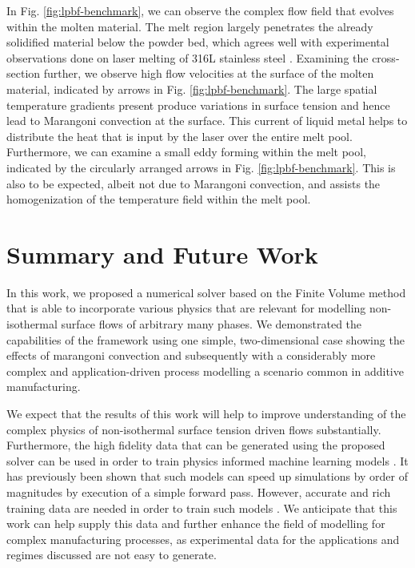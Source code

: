 \documentclass[conference,final]{IEEEtran}
\begin{document}
In Fig. \ref{fig:lpbf-benchmark}, we can observe the complex flow field that evolves within the molten material. The melt region largely penetrates the already solidified material below the powder bed, which agrees well with experimental observations done on laser melting of 316L stainless steel \cite{mohrInSituDefectDetection2020}.
Examining the cross-section further, we observe high flow velocities at the surface of the molten material, indicated by arrows in Fig. \ref{fig:lpbf-benchmark}. The large spatial temperature gradients present produce variations in surface tension and hence lead to Marangoni convection at the surface. This current of liquid metal helps to distribute the heat that is input by the laser over the entire melt pool.
Furthermore, we can examine a small eddy forming within the melt pool, indicated by the circularly arranged arrows in Fig. \ref{fig:lpbf-benchmark}. This is also to be expected, albeit not due to Marangoni convection, and assists the homogenization of the temperature field within the melt pool.

\section{Summary and Future Work}

In this work, we proposed a numerical solver based on the Finite Volume method that is able to incorporate various physics that are relevant for modelling non-isothermal surface flows of arbitrary many phases. We demonstrated the capabilities of the framework using one simple, two-dimensional case showing the effects of marangoni convection and subsequently with a considerably more complex and application-driven process modelling a scenario common in additive manufacturing.

We expect that the results of this work will help to improve understanding of the complex physics of non-isothermal surface tension driven flows substantially. Furthermore, the high fidelity data that can be generated using the proposed solver can be used in order to train physics informed machine learning models \cite{karniadakisPhysicsinformedMachineLearning2021}. It has previously been shown that such models can speed up simulations by order of magnitudes by execution of a simple forward pass. However, accurate and rich training data are needed in order to train such models \cite{liFourierNeuralOperator2021,luDeepONetLearningNonlinear2020}. We anticipate that this work can help supply this data and further enhance the field of modelling for complex manufacturing processes, as experimental data for the applications and regimes discussed are not easy to generate.
\end{document}
